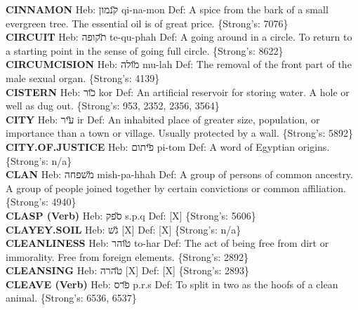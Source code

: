 {\textbf{CINNAMON} Heb: {\large\H קנמון} qi-na-mon Def: A spice from the bark of a small evergreen tree. The essential oil is of great price. \{Strong's: 7076\}\hfill{}\\

\textbf{CIRCUIT} Heb: {\large\H תקופה} te-qu-phah Def: A going around in a circle. To return to a starting point in the sense of going full circle. \{Strong's: 8622\}\hfill{}\\

\textbf{CIRCUMCISION} Heb: {\large\H מולה} mu-lah Def: The removal of the front part of the male sexual organ. \{Strong's: 4139\}\hfill{}\\

\textbf{CISTERN} Heb: {\large\H כור} kor Def: An artificial reservoir for storing water. A hole or well as dug out. \{Strong's: 953, 2352, 2356, 3564\}\hfill{}\\

\textbf{CITY} Heb: {\large\H עיר} ir Def: An inhabited place of greater size, population, or importance than a town or village. Usually protected by a wall. \{Strong's: 5892\}\hfill{}\\

\textbf{CITY.OF.JUSTICE} Heb: {\large\H פיתום} pi-tom Def: A word of Egyptian origins. \{Strong's: n/a\}\hfill{}\\

\textbf{CLAN} Heb: {\large\H משפחה} mish-pa-hhah Def: A group of persons of common ancestry. A group of people joined together by certain convictions or common affiliation. \{Strong's: 4940\}\hfill{}\\

\textbf{CLASP (Verb)} Heb: {\large\H ספק} s.p.q Def: {[}X{]} \{Strong's: 5606\}\hfill{}\\

\textbf{CLAYEY.SOIL} Heb: {\large\H גש} {[}X{]} Def: {[}X{]} \{Strong's: n/a\}\hfill{}\\

\textbf{CLEANLINESS} Heb: {\large\H טוהר} to-har Def: The act of being free from dirt or immorality. Free from foreign elements. \{Strong's: 2892\}\hfill{}\\

\textbf{CLEANSING} Heb: {\large\H טהרה} {[}X{]} Def: {[}X{]} \{Strong's: 2893\}\hfill{}\\

\textbf{CLEAVE (Verb)} Heb: {\large\H פרס} p.r.s Def: To split in two as the hoofs of a clean animal. \{Strong's: 6536, 6537\}\hfill{}\\

}
